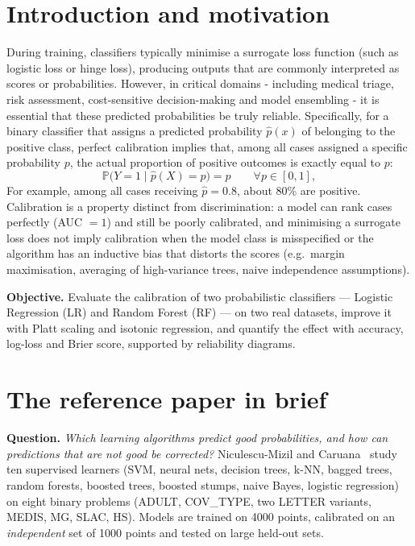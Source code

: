 \documentclass[11pt,a4paper]{article}
\newcommand{\Prob}{\mathbb{P}}
\begin{document}
\section{Introduction and motivation}
During training, classifiers typically minimise a surrogate loss function (such as logistic loss or hinge loss), producing outputs that are commonly interpreted as scores or probabilities. However, in critical domains - including medical triage, risk assessment, cost-sensitive decision-making and model ensembling - it is essential that these predicted probabilities be truly reliable. Specifically, for a binary classifier that assigns a predicted probability $\hat{p}(x)$ of belonging to the positive class, perfect calibration implies that, among all cases assigned a specific probability $p$, the actual proportion of positive outcomes is exactly equal to $p$:
\begin{equation}
\Prob\big(Y=1 \mid \hat p(X)=p\big) = p \qquad \forall p\in[0,1],
\end{equation}
For example, among all cases receiving $\hat p = 0.8$, about 80\% are positive. Calibration is a property distinct from discrimination: a model can rank cases perfectly (AUC $=1$) and still be poorly calibrated, and minimising a surrogate loss does not imply calibration when the model class is misspecified or the algorithm has an inductive bias that distorts the scores (e.g.\ margin maximisation, averaging of high-variance trees, naive independence assumptions).

\textbf{Objective.} Evaluate the calibration of two probabilistic classifiers --- Logistic Regression (LR) and Random Forest (RF) --- on two real datasets, improve it with Platt scaling and isotonic regression, and quantify the effect with accuracy, log-loss and Brier score, supported by reliability diagrams.

\section{The reference paper in brief}
\textbf{Question.} \emph{Which learning algorithms predict good probabilities, and how can predictions that are not good be corrected?} Niculescu-Mizil and Caruana~\cite{nmc05} study ten supervised learners (SVM, neural nets, decision trees, k-NN, bagged trees, random forests, boosted trees, boosted stumps, naive Bayes, logistic regression) on eight binary problems (ADULT, COV\_TYPE, two LETTER variants, MEDIS, MG, SLAC, HS). Models are trained on 4000 points, calibrated on an \emph{independent} set of 1000 points and tested on large held-out sets.
\end{document}
